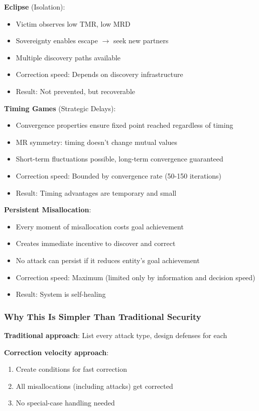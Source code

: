 \documentclass[11pt,a4paper]{article}
\theoremstyle{definition}
\theoremstyle{remark}
\begin{document}
\textbf{Eclipse} (Isolation):
\begin{itemize}
\item Victim observes low TMR, low MRD
\item Sovereignty enables escape $\rightarrow$ seek new partners
\item Multiple discovery paths available
\item Correction speed: Depends on discovery infrastructure
\item Result: Not prevented, but recoverable
\end{itemize}

\textbf{Timing Games} (Strategic Delays):
\begin{itemize}
\item Convergence properties ensure fixed point reached regardless of timing
\item MR symmetry: timing doesn't change mutual values
\item Short-term fluctuations possible, long-term convergence guaranteed
\item Correction speed: Bounded by convergence rate (50-150 iterations)
\item Result: Timing advantages are temporary and small
\end{itemize}

\textbf{Persistent Misallocation}:
\begin{itemize}
\item Every moment of misallocation costs goal achievement
\item Creates immediate incentive to discover and correct
\item No attack can persist if it reduces entity's goal achievement
\item Correction speed: Maximum (limited only by information and decision speed)
\item Result: System is self-healing
\end{itemize}

\subsubsection{Why This Is Simpler Than Traditional Security}

\textbf{Traditional approach}: List every attack type, design defenses for each

\textbf{Correction velocity approach}:
\begin{enumerate}
\item Create conditions for fast correction
\item All misallocations (including attacks) get corrected
\item No special-case handling needed
\end{enumerate}
\end{document}
